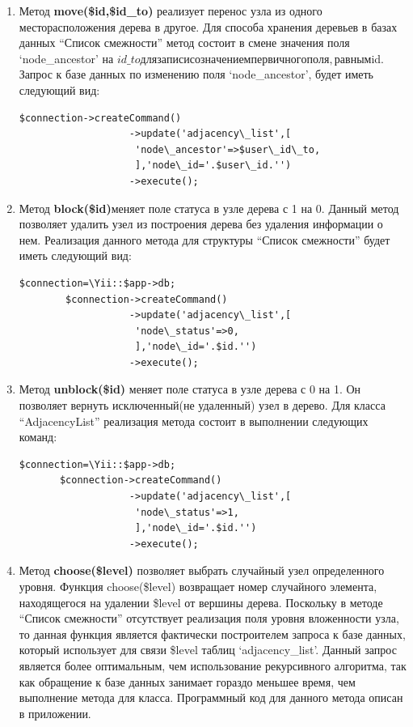 \documentclass[a4paper,14pt]{extreport}
\theoremstyle{definition}
\begin{document}
\begin{enumerate}
\item Метод \textbf{move(\$id,\$id\_to)} реализует перенос узла из одного месторасположения дерева в другое. Для способа хранения деревьев в базах данных “Список смежности” метод состоит в смене значения поля ‘node\_ancestor’ на $id\_to для записи со значением первичного поля, равным $id. Запрос к базе данных по изменению поля ‘node\_ancestor’, будет иметь следующий вид:
\begin{verbatim}
$connection->createCommand()
                   ->update('adjacency\_list',[
                    'node\_ancestor'=>$user\_id\_to,
                    ],'node\_id='.$user\_id.'')
                   ->execute();\end{verbatim}
\item Метод \textbf{block(\$id)}меняет поле статуса в узле дерева с 1 на 0. Данный метод позволяет удалить узел из построения дерева без удаления информации о нем. Реализация данного метода для структуры “Список смежности” будет иметь следующий вид:
\begin{verbatim}
$connection=\Yii::$app->db;
        $connection->createCommand()
                   ->update('adjacency\_list',[
                    'node\_status'=>0,
                    ],'node\_id='.$id.'')
                   ->execute(); \end{verbatim}
\item Метод \textbf{unblock(\$id)} меняет поле статуса в узле дерева с 0 на 1. Он позволяет вернуть исключенный(не удаленный) узел в дерево. Для класса “AdjacencyList” реализация метода состоит в выполнении следующих команд:
\begin{verbatim}
$connection=\Yii::$app->db;
       $connection->createCommand()
                   ->update('adjacency\_list',[
                    'node\_status'=>1,
                    ],'node\_id='.$id.'')
                   ->execute(); \end{verbatim}
\item Метод \textbf{choose(\$level)} позволяет выбрать случайный узел определенного уровня. Функция choose(\$level) возвращает номер случайного элемента, находящегося на удалении \$level от вершины дерева. Поскольку в методе “Список смежности” отсутствует реализация поля уровня вложенности узла, то данная функция является фактически построителем запроса к базе данных, который использует для связи \$level таблиц ‘adjacency\_list’. Данный запрос является более оптимальным, чем использование рекурсивного алгоритма, так как обращение к базе данных занимает гораздо меньшее время, чем выполнение метода для класса. Программный код для данного метода описан в приложении.

\end{enumerate}
\end{document}

